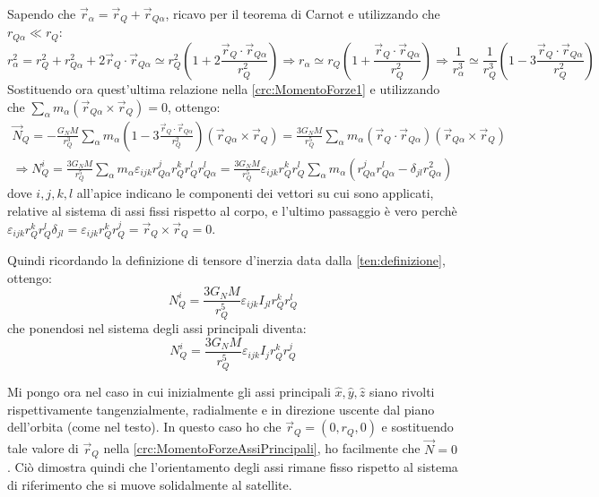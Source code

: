 \documentclass[../main.tex]{subfiles}
\begin{document}
Sapendo che $\vec r_\alpha=\vec r_Q+\vec r_{Q\alpha}$, ricavo per il teorema di Carnot e utilizzando che $r_{Q\alpha}\ll r_Q$:
\begin{equation*}
	r_\alpha^2=r_Q^2+r_{Q\alpha}^2+2\vec r_Q\cdot \vec r_{Q\alpha}\simeq r_Q^2 \left( 1+2\frac{\vec r_Q\cdot \vec r_{Q\alpha}}{r_Q^2} \right)
	\Longrightarrow  r_\alpha \simeq r_Q \left( 1+\frac{\vec r_Q\cdot \vec r_{Q\alpha}}{r_Q^2} \right) \Longrightarrow  \frac{1}{r_\alpha^3} \simeq \frac{1}{r_Q^3} \left( 1-3\frac{\vec r_Q\cdot \vec r_{Q\alpha}}{r_Q^2} \right)
\end{equation*}
Sostituendo ora quest'ultima relazione nella \cref{crc:MomentoForze1} e utilizzando che $\sum_\alpha m_\alpha(\vec r_{Q\alpha} \times \vec r_Q)=0$, ottengo:
\begin{gather*}
	\vec N_Q = -\frac{G_NM}{r_Q^3} \sum_\alpha m_\alpha\left( 1-3\frac{\vec r_Q\cdot \vec r_{Q\alpha}}{r_Q^2} \right) (\vec r_{Q\alpha} \times \vec r_Q) =  \frac{3G_N M}{r_Q^5} \sum_\alpha m_\alpha(\vec r_Q\cdot \vec r_{Q\alpha})( \vec r_{Q\alpha}\times \vec r_Q)\\
	\Longrightarrow N_Q^i =\frac{3G_N M}{r_Q^5} \sum_\alpha m_\alpha\varepsilon_{ijk}r_{Q\alpha}^jr_Q^k r_Q^lr_{Q\alpha}^l=\frac{3G_N M}{r_Q^5} \varepsilon_{ijk} r_Q^k r_Q^l\sum_\alpha m_\alpha (r_{Q\alpha}^jr_{Q\alpha}^l-\delta_{jl} r_{Q\alpha}^2)
\end{gather*}
dove $i,j,k,l$ all'apice indicano le componenti dei vettori su cui sono applicati, relative al sistema di assi fissi rispetto al corpo, e l'ultimo passaggio è vero perchè $\varepsilon_{ijk} r_Q^k r_Q^l \delta_{jl}=\varepsilon_{ijk} r_Q^k r_Q^j=\vec r_Q \times \vec r_Q =0$.

Quindi ricordando la definizione di tensore d'inerzia data dalla \cref{ten:definizione}, ottengo:
\begin{equation}\label{crc:MomentoForze}
	N_Q^i=\frac{3G_N M}{r_Q^5} \varepsilon_{ijk} I_{jl} r_Q^k r_Q^l
\end{equation}
che ponendosi nel sistema degli assi principali diventa:
\begin{equation}\label{crc:MomentoForzeAssiPrincipali}
	N_Q^i=\frac{3G_N M}{r_Q^5} \varepsilon_{ijk} I_{j} r_Q^k r_Q^j
\end{equation}

Mi pongo ora nel caso in cui inizialmente gli assi principali $\hat x, \hat y, \hat z$ siano rivolti rispettivamente tangenzialmente, radialmente e in direzione uscente dal piano dell'orbita (come nel testo).
In questo caso ho che $\vec r_Q=(0,r_Q,0)$ e sostituendo tale valore di $\vec r_Q$ nella \cref{crc:MomentoForzeAssiPrincipali}, ho facilmente che $\vec N=0$. Ciò dimostra quindi che l'orientamento degli assi rimane fisso rispetto al sistema di riferimento che si muove solidalmente al satellite.
\end{document}
